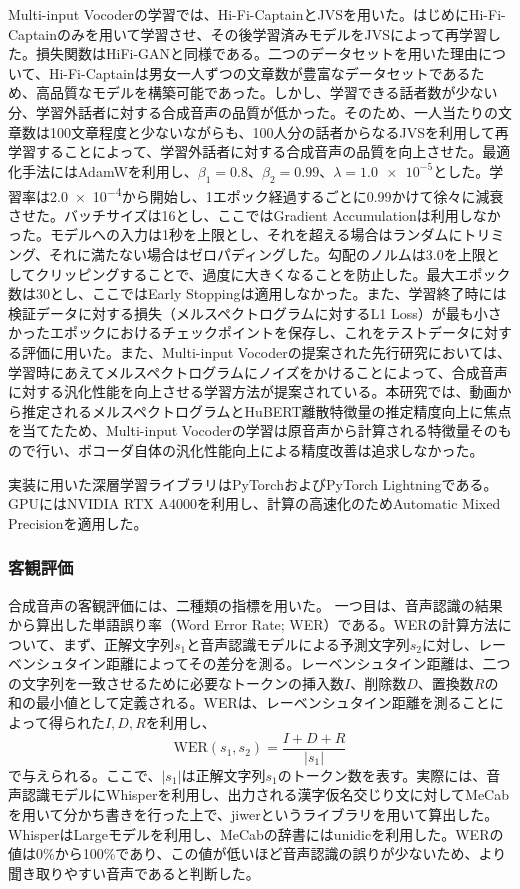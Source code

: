 \documentclass[12pt]{jarticle}
\numberwithin{equation}{section}    %
\numberwithin{figure}{section}      %
\numberwithin{table}{section}      %
\begin{document}
Multi-input Vocoderの学習では、Hi-Fi-CaptainとJVSを用いた。はじめにHi-Fi-Captainのみを用いて学習させ、その後学習済みモデルをJVSによって再学習した。損失関数はHiFi-GANと同様である。二つのデータセットを用いた理由について、Hi-Fi-Captainは男女一人ずつの文章数が豊富なデータセットであるため、高品質なモデルを構築可能であった。しかし、学習できる話者数が少ない分、学習外話者に対する合成音声の品質が低かった。そのため、一人当たりの文章数は100文章程度と少ないながらも、100人分の話者からなるJVSを利用して再学習することによって、学習外話者に対する合成音声の品質を向上させた。最適化手法にはAdamWを利用し、$\beta_{1} = 0.8$、$\beta_{2} = 0.99$、$\lambda = \num{1.0e-5}$とした。学習率は\num{2.0e-4}から開始し、1エポック経過するごとに0.99かけて徐々に減衰させた。バッチサイズは16とし、ここではGradient Accumulationは利用しなかった。モデルへの入力は1秒を上限とし、それを超える場合はランダムにトリミング、それに満たない場合はゼロパディングした。勾配のノルムは3.0を上限としてクリッピングすることで、過度に大きくなることを防止した。最大エポック数は30とし、ここではEarly Stoppingは適用しなかった。また、学習終了時には検証データに対する損失（メルスペクトログラムに対するL1 Loss）が最も小さかったエポックにおけるチェックポイントを保存し、これをテストデータに対する評価に用いた。また、Multi-input Vocoderの提案された先行研究\cite{choi2023intelligible}においては、学習時にあえてメルスペクトログラムにノイズをかけることによって、合成音声に対する汎化性能を向上させる学習方法が提案されている。本研究では、動画から推定されるメルスペクトログラムとHuBERT離散特徴量の推定精度向上に焦点を当てたため、Multi-input Vocoderの学習は原音声から計算される特徴量そのもので行い、ボコーダ自体の汎化性能向上による精度改善は追求しなかった。

実装に用いた深層学習ライブラリはPyTorchおよびPyTorch Lightningである。GPUにはNVIDIA RTX A4000を利用し、計算の高速化のためAutomatic Mixed Precisionを適用した。

\subsubsection{客観評価}
合成音声の客観評価には、二種類の指標を用いた。
一つ目は、音声認識の結果から算出した単語誤り率（Word Error Rate; WER）である。WERの計算方法について、まず、正解文字列$s_{1}$と音声認識モデルによる予測文字列$s_{2}$に対し、レーベンシュタイン距離によってその差分を測る。レーベンシュタイン距離は、二つの文字列を一致させるために必要なトークンの挿入数$I$、削除数$D$、置換数$R$の和の最小値として定義される。WERは、レーベンシュタイン距離を測ることによって得られた$I, D, R$を利用し、
\begin{equation}
    \text{WER}(s_{1}, s_{2}) = \frac{I + D + R}{|s_{1}|}
\end{equation}
で与えられる。ここで、$|s_{1}|$は正解文字列$s_{1}$のトークン数を表す。実際には、音声認識モデルにWhisper\cite{radford2023robust}を利用し、出力される漢字仮名交じり文に対してMeCabを用いて分かち書きを行った上で、jiwerというライブラリを用いて算出した。WhisperはLargeモデルを利用し、MeCabの辞書にはunidicを利用した。WERの値は0\%から100\%であり、この値が低いほど音声認識の誤りが少ないため、より聞き取りやすい音声であると判断した。
\end{document}
